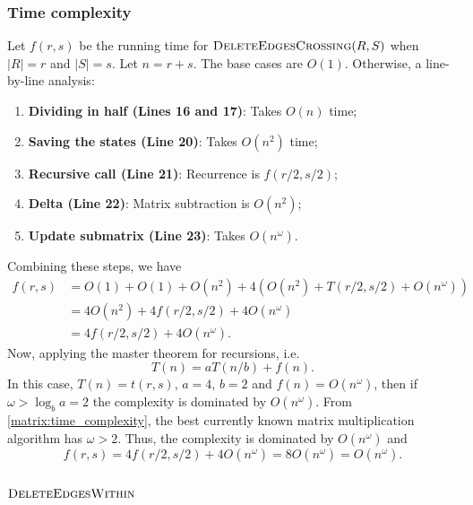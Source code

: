 \subsubsection{Time complexity}
\noindent
Let \(f(r, s)\) be the running time for \(\textsc{DeleteEdgesCrossing}(R, S)\) when \(|R| = r\) and \(|S| = s\).
Let \(n = r + s\). The base cases are \(O(1)\).
Otherwise, a line-by-line analysis:
\begin{enumerate}
    \item \textbf{Dividing in half (Lines 16 and 17)}: Takes \(O(n)\) time;
    \item \textbf{Saving the states (Line 20)}: Takes \(O(n^2)\) time;
    \item \textbf{Recursive call (Line 21)}: Recurrence is \(f(r/2, s/2)\);
    \item \textbf{Delta (Line 22)}: Matrix subtraction is \(O(n^2)\);
    \item \textbf{Update submatrix (Line 23)}: Takes \(O(n^\omega)\).
\end{enumerate}
Combining these steps, we have
\begin{align*}
    f(r, s) &= O(1) + O(1) + O(n^2) + 4(O(n^2) + T(r / 2, s / 2) + O(n^\omega))  \\
    &= 4O(n^2) + 4f(r / 2, s / 2) + 4O(n^\omega) \\
    &= 4f(r / 2, s / 2) + 4O(n^\omega).
\end{align*}
Now, applying the master theorem for recursions, i.e. 
\[
  T(n) = aT(n/b) + f(n).
\]
In this case, \(T(n) = t(r, s)\), \(a = 4\), \(b = 2\) and \(f(n) = O(n^\omega)\), then if \(\omega > \log_{b}a = 2\) the complexity is dominated by \(O(n^\omega)\).
From \cref{matrix:time_complexity}, the best currently known matrix multiplication algorithm has \(\omega > 2\).
Thus, the complexity is dominated by \(O(n^\omega)\) and
\begin{equation}
  \label{alg:delcrossing}
  f(r, s) = 4f(r/2, s/2) + 4O(n^\omega) = 8O(n^\omega) = O(n^\omega). 
\end{equation}

\subsection{\(\textsc{DeleteEdgesWithin}\)}

